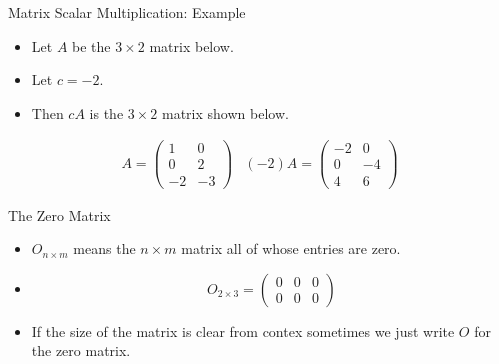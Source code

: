 \documentclass{beamer}
\begin{document}
\begin{frame}{Matrix Scalar Multiplication: Example}

\begin{itemize}
\item Let $A$ be the $3\times 2$ matrix below.
\item Let $c = -2$.
\item Then $cA$ is the $3\times 2$ matrix shown below.
\end{itemize}

$$
\begin{matrix}
A =

\begin{pmatrix}
1 & 0 \\
0 & 2 \\
-2 & -3
\end{pmatrix}

&

(-2) A =

\begin{pmatrix}
-2 & 0 \\
0 & -4 \\
4 &  6
\end{pmatrix}

\end{matrix}
$$

\end{frame}


\begin{frame}{The Zero Matrix}

\begin{itemize}
\item $O_{n\times m}$ means the $n\times m$ matrix all of whose entries are zero.
\item
$$O_{2\times 3} =
\begin{pmatrix}
0 & 0 & 0 \\
0 & 0 & 0
\end{pmatrix}
$$
\item If the size of the matrix is clear from contex sometimes we just
write $O$ for the zero matrix.
\end{itemize}

\end{frame}

\end{document}
